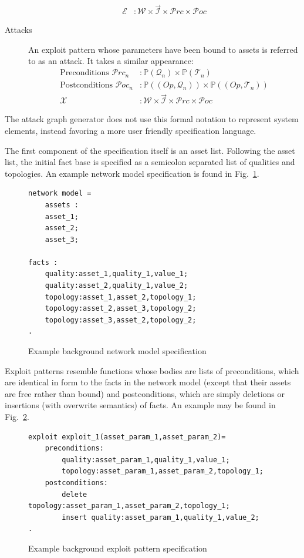 \begin{description}
\begin{align*}
			\mathcal{E}&: \mathcal{W} \times \vec{\mathcal{I}} \times  \mathcal{P}rc \times \mathcal{P}oc
        \end{align*}
    \item[Attacks] An exploit pattern whose parameters have been bound to assets is referred to as an
		attack. It takes a similar appearance:
		\begin{align*}
			\text{Preconditions } \mathcal{P}rc_n &: \mathbb{P}(\mathcal{Q}_n) \times \mathbb{P}(\mathcal{T}_n) \\
			\text{Postconditions } \mathcal{P}oc_n&: \mathbb{P}((Op,\mathcal{Q}_n)) \times \mathbb{P}((Op,\mathcal{T}_n)) \\
			\mathcal{X}&: \mathcal{W} \times \vec{\mathcal{I}} \times  \mathcal{P}rc \times \mathcal{P}oc
        \end{align*}
\end{description}

The attack graph generator does 
not use this formal notation to represent system elements, instead favoring a 
more user friendly specification language. 

The first component of the specification itself is an asset list. Following the
asset list, the initial
fact base is specified as a semicolon separated list of qualities and 
topologies. An example network model specification is found in 
Fig.~\ref{fig:nmspec}.

\begin{figure}
\begin{lstlisting}
network model = 
    assets :
    asset_1;
    asset_2;
    asset_3;

facts :
	quality:asset_1,quality_1,value_1;
	quality:asset_2,quality_1,value_2;
	topology:asset_1,asset_2,topology_1;
	topology:asset_2,asset_3,topology_2;
    topology:asset_3,asset_2,topology_2;
.
\end{lstlisting}
\caption{Example background network model specification}
\label{fig:nmspec}
\end{figure}
Exploit patterns resemble functions whose bodies are lists of preconditions,
which are identical in form to the facts in the network model (except that their
assets are free rather than bound) and postconditions, which are simply
deletions or insertions (with overwrite semantics) of facts. An example may be 
found in Fig.~\ref{fig:xpspec}.

\begin{figure}
\begin{lstlisting}
exploit exploit_1(asset_param_1,asset_param_2)=
    preconditions:
        quality:asset_param_1,quality_1,value_1;
        topology:asset_param_1,asset_param_2,topology_1;
    postconditions:
        delete topology:asset_param_1,asset_param_2,topology_1;
        insert quality:asset_param_1,quality_1,value_2;
.
\end{lstlisting}
\caption{Example background exploit pattern specification}
\label{fig:xpspec}
\end{figure}

